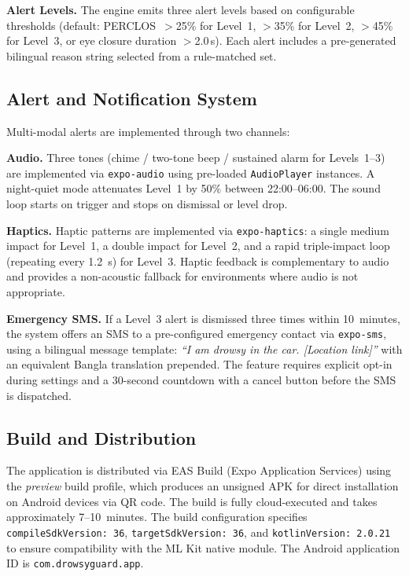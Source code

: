 \documentclass[sigconf]{acmart}
\begin{document}
\textbf{Alert Levels.} The engine emits three alert levels based on configurable thresholds (default: PERCLOS~$>$25\% for Level~1, $>$35\% for Level~2, $>$45\% for Level~3, or eye closure duration $>$2.0\,s). Each alert includes a pre-generated bilingual reason string selected from a rule-matched set.

\subsection{Alert and Notification System}

Multi-modal alerts are implemented through two channels:

\textbf{Audio.} Three tones (chime / two-tone beep / sustained alarm for Levels~1--3) are implemented via \texttt{expo-audio} using pre-loaded \texttt{AudioPlayer} instances. A night-quiet mode attenuates Level~1 by 50\% between 22:00--06:00. The sound loop starts on trigger and stops on dismissal or level drop.

\textbf{Haptics.} Haptic patterns are implemented via \texttt{expo-haptics}: a single medium impact for Level~1, a double impact for Level~2, and a rapid triple-impact loop (repeating every 1.2~s) for Level~3. Haptic feedback is complementary to audio and provides a non-acoustic fallback for environments where audio is not appropriate.

\textbf{Emergency SMS.} If a Level~3 alert is dismissed three times within 10~minutes, the system offers an SMS to a pre-configured emergency contact via \texttt{expo-sms}, using a bilingual message template: \textit{``I am drowsy in the car. [Location link]''} with an equivalent Bangla translation prepended. The feature requires explicit opt-in during settings and a 30-second countdown with a cancel button before the SMS is dispatched.

\subsection{Build and Distribution}

The application is distributed via EAS Build (Expo Application Services) using the \textit{preview} build profile, which produces an unsigned APK for direct installation on Android devices via QR code. The build is fully cloud-executed and takes approximately 7--10~minutes. The build configuration specifies \texttt{compileSdkVersion: 36}, \texttt{targetSdkVersion: 36}, and \texttt{kotlinVersion: 2.0.21} to ensure compatibility with the ML Kit native module. The Android application ID is \texttt{com.drowsyguard.app}.
\end{document}
